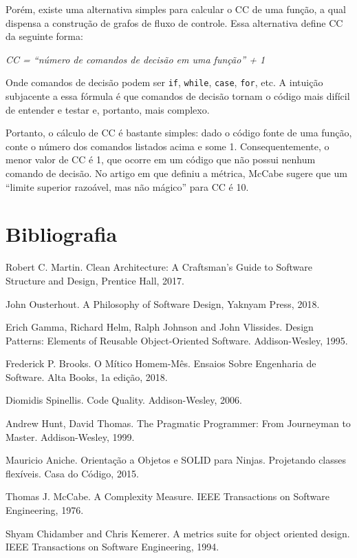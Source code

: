 \documentclass[
  11pt,
  twoside]{book}
\newcommand{\passthrough}[1]{#1}
\begin{document}
Porém, existe uma alternativa simples para calcular o CC de uma função,
a qual dispensa a construção de grafos de fluxo de controle. Essa
alternativa define CC da seguinte forma:

\emph{CC = ``número de comandos de decisão em uma função'' + 1}

Onde comandos de decisão podem ser \passthrough{\lstinline!if!},
\passthrough{\lstinline!while!}, \passthrough{\lstinline!case!},
\passthrough{\lstinline!for!}, etc. A intuição subjacente a essa fórmula
é que comandos de decisão tornam o código mais difícil de entender e
testar e, portanto, mais complexo.

Portanto, o cálculo de CC é bastante simples: dado o código fonte de uma
função, conte o número dos comandos listados acima e some 1.
Consequentemente, o menor valor de CC é 1, que ocorre em um código que
não possui nenhum comando de decisão. No artigo em que definiu a
métrica, McCabe sugere que um ``limite superior razoável, mas não
mágico'' para CC é 10.

\hypertarget{bibliografia-4}{%
\section*{Bibliografia}\label{bibliografia-4}}

Robert C. Martin. Clean Architecture: A Craftsman's Guide to Software
Structure and Design, Prentice Hall, 2017.

John Ousterhout. A Philosophy of Software Design, Yaknyam Press, 2018.

Erich Gamma, Richard Helm, Ralph Johnson and John Vlissides. Design
Patterns: Elements of Reusable Object-Oriented Software. Addison-Wesley,
1995.

Frederick P. Brooks. O Mítico Homem-Mês. Ensaios Sobre Engenharia de
Software. Alta Books, 1a edição, 2018.

Diomidis Spinellis. Code Quality. Addison-Wesley, 2006.

Andrew Hunt, David Thomas. The Pragmatic Programmer: From Journeyman to
Master. Addison-Wesley, 1999.

Mauricio Aniche. Orientação a Objetos e SOLID para Ninjas. Projetando
classes flexíveis. Casa do Código, 2015.

Thomas J. McCabe. A Complexity Measure. IEEE Transactions on Software
Engineering, 1976.

Shyam Chidamber and Chris Kemerer. A metrics suite for object oriented
design. IEEE Transactions on Software Engineering, 1994.
\end{document}

